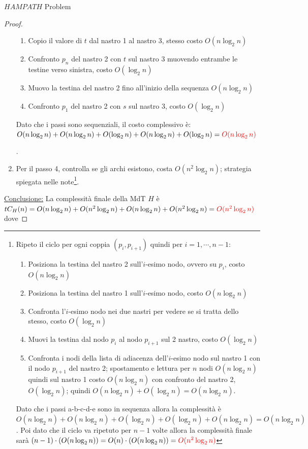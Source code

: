\documentclass{article}  %
\theoremstyle{definition}
\begin{document}
\begin{theorem}{$HAMPATH$ Problem}
\begin{proof}
\begin{enumerate}
{\begin{enumerate}
					      \item Copio il valore di $t$ dal nastro 1 al nastro 3, stesso costo $O(n\log_2n)$
					      \item Confronto $p_n$ del nastro 2 con $t$ sul nastro 3 muovendo entrambe le testine verso sinistra, costo $O(\log_2n)$
					      \item Muovo la testina del nastro 2 fino all'inizio della sequenza $O(n\log_2n)$
					      \item Confronto $p_1$ del nastro 2 con $s$ sul nastro 3, costo $O(\log_2n)$
				      \end{enumerate}
				      Dato che i passi sono sequenziali, il costo complessivo è: $O(n\log_2n)+O(n\log_2n)+O(\log_2n)+O(n\log_2n)+O(\log_2n)=\textcolor{red}{O(n\log_2n)}$\\
			      }.
			\item Per il passo 4, controlla se gli archi esistono, costa $O(n^2\log_2n)$; strategia spiegata nelle note\footnote{
				      Ripeto il ciclo per ogni coppia $(p_i, p_{i+1})$ quindi per $i=1, \cdots, n-1$:
				      \begin{enumerate}
					      \item Posiziona la testina del nastro 2 sull'$i$-esimo nodo, ovvero su $p_i$, costo $O(n\log_2n)$
					      \item Posiziona la testina del nastro 1 sull'$i$-esimo nodo, costo $O(n\log_2n)$
					      \item Confronta l'$i$-esimo nodo nei due nastri per vedere se si tratta dello stesso, costo $O(\log_2n)$
					      \item Muovi la testina dal nodo $p_i$ al nodo $p_{i+1}$ sul 2 nastro, costo $O(\log_2n)$
					      \item Confronta i nodi della lista di adiacenza dell'$i$-esimo nodo sul nastro 1 con il nodo $p_{i+1}$ del nastro 2; spostamento
					            e lettura per $n$ nodi $O(n\log_2n)$ quindi sul nastro 1 costo $O(n\log_2n)$ con confronto del nastro 2, $O(\log_2n)$; quindi
					            $O(n\log_2n)+O(\log_2n)=O(n\log_2n)$.
				      \end{enumerate}
				      Dato che i passi a-b-c-d-e sono in sequenza allora la complessità è $O(n\log_2n)+O(n\log_2n)+O(\log_2n)+O(\log_2n)+O(n\log_2n)=O(n\log_2n)$. Poi
				      dato che il ciclo va ripetuto per $n-1$ volte allora la complessità finale sarà $(n-1)\cdot(O(n\log_2n))=O(n)\cdot(O(n\log_2n))
					      =\textcolor{red}{O(n^2\log_2n)}$
			      }.
		\end{enumerate}
		\underline{Conclusione:} La complessità finale della MdT $H$ è $tC_H(n)=O(n\log_2n)+O(n^2\log_2n)+O(n\log_2n)+O(n^2\log_2n)=\textcolor{red}{O(n^2\log_2n)}$ dove

\end{proof}
\end{theorem}
\end{document}
